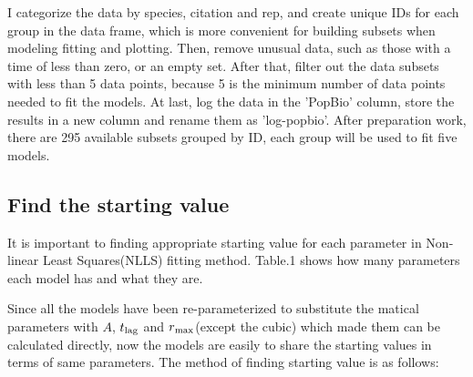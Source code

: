 \documentclass[11pt]{article}
\begin{document}
    I categorize the data by species, citation and rep, and create unique IDs for each group in the data frame, which is more convenient for building subsets when modeling fitting and plotting. Then, remove unusual data, such as those with a time of less than zero, or an empty set. After that, filter out the data subsets with less than 5 data points, because 5 is the minimum number of data points needed to fit the models. At last, log the data in the 'PopBio' column, store the results in a new column and rename them as 'log-popbio'. After preparation work, there are 295 available subsets grouped by ID, each group will be used to fit five models.
    
    \subsection{Find the starting value}
    It is important to finding appropriate starting value for each parameter in Non-linear Least Squares(NLLS) fitting method. Table.1 shows how many parameters each model has and what they are.
    \begin{table}[H] \centering
        \label{table1}
        \caption{Five selected models and their parameters}
    \end{table}
    
    Since all the models have been re-parameterized to substitute the matical parameters with $A$, $t\textsubscript{lag}$ and $r\textsubscript{max}$(except the cubic) which made them can be calculated directly, now the models are easily to share the starting values in terms of same parameters. The method of finding starting value is as follows:
    
\end{document}
